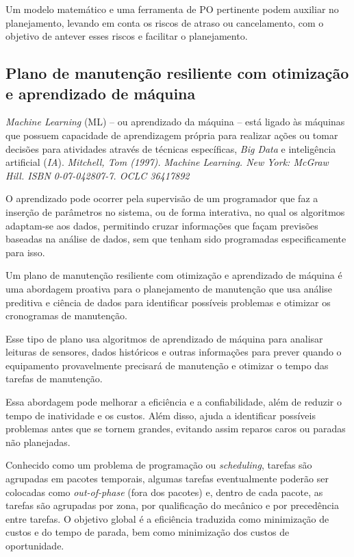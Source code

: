 \documentclass{article}
\begin{document}
Um modelo matemático e uma ferramenta de PO pertinente podem auxiliar no planejamento, levando em conta os riscos de atraso ou cancelamento, com o objetivo de antever esses riscos e facilitar o planejamento.

\subsection{Plano de manutenção resiliente com otimização e aprendizado de máquina}

{\it Machine Learning} (ML) – ou aprendizado da máquina – está ligado às máquinas que possuem capacidade de aprendizagem própria para realizar ações ou tomar decisões para atividades através de técnicas específicas, {\it Big Data} e inteligência artificial ({\it IA}). {\it Mitchell, Tom (1997). Machine Learning. New York: McGraw Hill. ISBN 0-07-042807-7. OCLC 36417892}  

O aprendizado pode ocorrer pela supervisão de um programador que faz a inserção de parâmetros no sistema, ou de forma interativa, no qual os algoritmos adaptam-se aos dados, permitindo cruzar informações que façam previsões baseadas na análise de dados, sem que tenham sido programadas especificamente para isso.

Um plano de manutenção resiliente com otimização e aprendizado de máquina é uma abordagem proativa para o planejamento de manutenção que usa análise preditiva e ciência de dados para identificar possíveis problemas e otimizar os cronogramas de manutenção.

Esse tipo de plano usa algoritmos de aprendizado de máquina para analisar leituras de sensores, dados históricos e outras informações para prever quando o equipamento provavelmente precisará de manutenção e otimizar o tempo das tarefas de manutenção.

Essa abordagem pode melhorar a eficiência e a confiabilidade, além de reduzir o tempo de inatividade e os custos. Além disso, ajuda a identificar possíveis problemas antes que se tornem grandes, evitando assim reparos caros ou paradas não planejadas.

Conhecido como um problema de programação ou {\it scheduling}, tarefas são agrupadas em pacotes temporais, algumas tarefas eventualmente poderão ser colocadas como {\it out-of-phase} (fora dos pacotes) e, dentro de cada pacote, as tarefas são agrupadas por zona, por qualificação do mecânico e por precedência entre tarefas.
O objetivo global é a eficiência traduzida como minimização de custos e do tempo de parada, bem como minimização dos custos de oportunidade.
\end{document}
